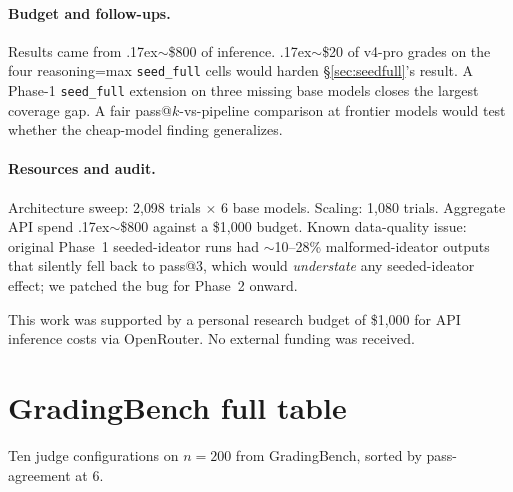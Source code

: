 \documentclass{article}
\begin{document}
\paragraph{Budget and follow-ups.}
Results came from {\raise.17ex\hbox{$\scriptstyle\sim$}}\$800 of inference.
{\raise.17ex\hbox{$\scriptstyle\sim$}}\$20 of v4-pro grades on the four reasoning=max
\texttt{seed\_full} cells would harden \S\ref{sec:seedfull}'s result.
A Phase-1 \texttt{seed\_full} extension on three missing base models closes the
largest coverage gap.
A fair pass@$k$-vs-pipeline comparison at frontier models would test whether the
cheap-model finding generalizes.

\paragraph{Resources and audit.}
Architecture sweep: 2{,}098 trials $\times$ 6 base models.
Scaling: 1{,}080 trials.
Aggregate API spend {\raise.17ex\hbox{$\scriptstyle\sim$}}\$800 against a \$1{,}000 budget.
Known data-quality issue: original Phase~1 seeded-ideator runs had
$\sim$10--28\% malformed-ideator outputs that silently fell back to pass@3,
which would \emph{understate} any seeded-ideator effect; we patched the bug for
Phase~2 onward.



\begin{ack}
This work was supported by a personal research budget of \$1{,}000 for API
inference costs via OpenRouter. No external funding was received.
\end{ack}


{\small


}

\appendix

\section{GradingBench full table}
\label{app:gradingbench}

Ten judge configurations on $n{=}200$ from GradingBench, sorted by pass-agreement at 6.
\end{document}
